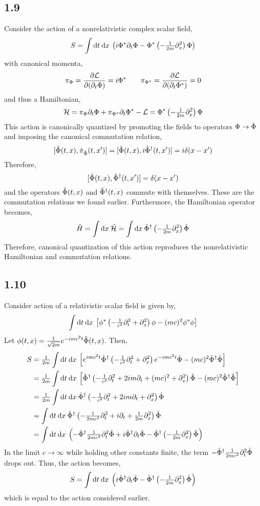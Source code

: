 \documentclass[12pt]{extarticle}
\begin{document}
\subsection*{1.9}
Consider the action of a nonrelativistic complex scalar field,
\[ S = \int \mathrm{d}t \: \mathrm{d}x \: \left( i \Phi^* \partial_t \Phi - \Phi^* \left(-\tfrac{1}{2m} \partial_x^2 \right) \Phi \right) \] 
with canonical momenta,
\[ \pi_{\Phi} = \frac{\partial{\mathcal{L}}}{\partial{(\partial_t \Phi)}} = i \Phi^* \quad \quad \pi_{\Phi^*} = \frac{\partial{\mathcal{L}}}{\partial{(\partial_t \Phi^*)}} = 0 \]
and thus a Hamiltonian,
\[ \mathcal{H} = \pi_\Phi \partial_t \Phi + \pi_{\Phi^*} \partial_t \Phi^* - \mathcal{L} = \Phi^* \left(-\tfrac{1}{2m} \partial_x^2 \right) \Phi\]
This action is canonically quantized by promoting the fields to operators $\Phi \to \hat{\Phi}$ and imposing the canonical commutation relation,
\[ [ \hat{\Phi}(t, x), \hat{\pi}_{\hat{\Phi}}(t, x')] = [\hat{\Phi}(t, x), i\hat{\Phi}^\dagger(t, x')] = i \delta(x - x')\] 
Therefore,
\[ [\hat{\Phi}(t, x), \hat{\Phi}^\dagger(t, x')] = \delta(x - x')\]
and the operators $\hat{\Phi}(t, x)$ and $\hat{\Phi}^\dagger(t, x)$ commute with themselves. These are the commutation relations we found earlier. Furthermore, the Hamiltonian operator becomes,
\[ \hat{H} = \int \mathrm{d}x \: \hat{\mathcal{H}} = \int \mathrm{d}x \: \hat{\Phi}^\dagger \left(-\tfrac{1}{2m} \partial_x^2 \right) \hat{\Phi} \]
Therefore, canonical quantization of this action reproduces the nonrelativistic Hamiltonian and commutation relations. 
\subsection*{1.10}
Consider action of a relativistic scalar field is given by,
\[ \int \mathrm{d}t \: \mathrm{d}x \: \left[ \phi^* \left( - \tfrac{1}{c^2} \partial_t^2 + \partial_x^2 \right) \phi - (mc)^2 \phi^* \phi \right] \]
Let $\phi(t, x) = \tfrac{1}{\sqrt{2m}} e^{- i m c^2 t}\hat{\Phi}(t, x)$. Then,
\begin{align*}
S & = \tfrac{1}{2m} \int \mathrm{d}t \: \mathrm{d}x \: \left[ e^{i m c^2 t} \hat{\Phi}^\dagger \left( - \tfrac{1}{c^2} \partial_t^2 + \partial_x^2 \right) e^{- i m c^2 t} \hat{\Phi} - (mc)^2 \hat{\Phi}^\dagger \hat{\Phi} \right]
\\
& = \tfrac{1}{2m} \int \mathrm{d}t \: \mathrm{d}x \: \left[ \hat{\Phi}^\dagger \left( - \tfrac{1}{c^2} \partial_t^2 + 2 i m \partial_t + (mc)^2 +  \partial_x^2 \right) \hat{\Phi} - (mc)^2 \hat{\Phi}^\dagger \hat{\Phi} \right]
\\
& = \tfrac{1}{2m} \int \mathrm{d}t \: \mathrm{d}x \: \hat{\Phi}^\dagger \left( - \tfrac{1}{c^2} \partial_t^2 + 2 i m \partial_t + \partial_x^2 \right) \hat{\Phi}
\\
& = \int \mathrm{d}t \: \mathrm{d}x \: \hat{\Phi}^\dagger \left( - \tfrac{1}{2 m c^2} \partial_t^2 + i \partial_t + \tfrac{1}{2m} \partial_x^2 \right) \hat{\Phi}
\\
& = \int \mathrm{d}t \: \mathrm{d}x \: \left( - \hat{\Phi}^\dagger \tfrac{1}{2 m c^2} \partial_t^2 \hat{\Phi} + i \hat{\Phi}^\dagger  \partial_t \hat{\Phi} - \hat{\Phi}^\dagger \left( - \tfrac{1}{2m} \partial_x^2 \right) \hat{\Phi} \right)
\end{align*}
In the limit $c \to \infty$ while holding other constants finite, the term $- \hat{\Phi}^\dagger \tfrac{1}{2 m c^2} \partial_t^2 \hat{\Phi}$ drops out. Thus, the action becomes,
\[ S =  \int \mathrm{d}t \: \mathrm{d}x \: \left( i \hat{\Phi}^\dagger  \partial_t \hat{\Phi} - \hat{\Phi}^\dagger \left( - \tfrac{1}{2m} \partial_x^2 \right) \hat{\Phi} \right)\]
which is equal to the action considered earlier. 
\end{document}
